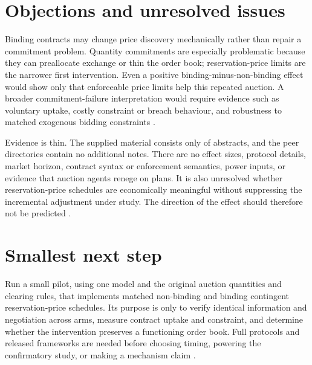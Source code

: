 \documentclass{article}
\begin{document}
\section{Objections and unresolved issues}

Binding contracts may change price discovery mechanically rather than repair a commitment problem.  Quantity commitments are especially problematic because they can preallocate exchange or thin the order book; reservation-price limits are the narrower first intervention.  Even a positive binding-minus-non-binding effect would show only that enforceable price limits help this repeated auction.  A broader commitment-failure interpretation would require evidence such as voluntary uptake, costly constraint or breach behaviour, and robustness to matched exogenous bidding constraints .

Evidence is thin.  The supplied material consists only of abstracts, and the peer directories contain no additional notes.  There are no effect sizes, protocol details, market horizon, contract syntax or enforcement semantics, power inputs, or evidence that auction agents renege on plans.  It is also unresolved whether reservation-price schedules are economically meaningful without suppressing the incremental adjustment under study.  The direction of the effect should therefore not be predicted .

\section{Smallest next step}

Run a small pilot, using one model and the original auction quantities and clearing rules, that implements matched non-binding and binding contingent reservation-price schedules.  Its purpose is only to verify identical information and negotiation across arms, measure contract uptake and constraint, and determine whether the intervention preserves a functioning order book.  Full protocols and released frameworks are needed before choosing timing, powering the confirmatory study, or making a mechanism claim .
\end{document}
